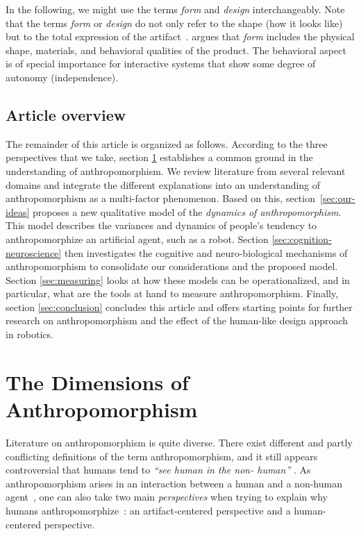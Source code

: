 \documentclass{frontiersSCNS} %
\begin{document}
In the following, we might use the terms \emph{form} and \emph{design}
interchangeably. Note that the terms \textit{form} or {\it design} do not only
refer to the shape (how it looks like) but to the total expression of the
artifact~\citep{bartneck_shaping_2004}. \citet{disalvo_hug:_2003} argues that
\textit{form} includes the physical shape, materials, and behavioral qualities
of the product. The behavioral aspect is of special importance for interactive
systems that show some degree of autonomy (independence).

\subsection{Article overview}

The remainder of this article is organized as follows.  According to the three
perspectives that we take, section \ref{sec:anthropomorphism} establishes a
common ground in the understanding of anthropomorphism. We review literature
from several relevant domains and integrate the different explanations into an
understanding of anthropomorphism as a multi-factor phenomenon.  Based on this,
section~\ref{sec:our-ideas} proposes a new qualitative model of the
\textit{dynamics of anthropomorphism}. This model describes the variances and
dynamics of people's tendency to anthropomorphize an artificial agent, such as a
robot. Section \ref{sec:cognition-neuroscience} then investigates the cognitive
and neuro-biological mechanisms of anthropomorphism to consolidate our
considerations and the proposed model.  Section \ref{sec:measuring} looks at how
these models can be operationalized, and in particular, what are the tools at
hand to measure anthropomorphism. Finally, section \ref{sec:conclusion}
concludes this article and offers starting points for further research on
anthropomorphism and the effect of the human-like design approach in robotics.


%
%
%
%
%
%

\section{The Dimensions of Anthropomorphism}
\label{sec:anthropomorphism}

Literature on anthropomorphism is quite diverse. There exist different and
partly conflicting definitions of the term anthropomorphism, and it still
appears controversial that humans tend to \textit{``see human in the non-
human''} \citep{epley_seeing_2007}. As anthropomorphism arises in an interaction
between a human and a non-human agent~\citep{persson_anthropomorphism_2000}, one
can also take two main \textit{perspectives} when trying to explain why humans
anthropomorphize~\citep{lee_human_2005}: an artifact-centered perspective and a
human-centered perspective.
\end{document}
